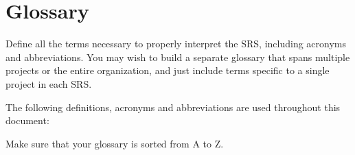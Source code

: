 
\chapter{Glossary}

Define all the terms necessary to properly interpret the SRS,
including acronyms and abbreviations. You may wish to build a separate
glossary that spans multiple projects or the entire organization, and
just include terms specific to a single project in each SRS.


The following definitions, acronyms and abbreviations are used throughout this document:
\begin{enumerate}


Make sure that your glossary is sorted from A to Z.

\end{enumerate}
